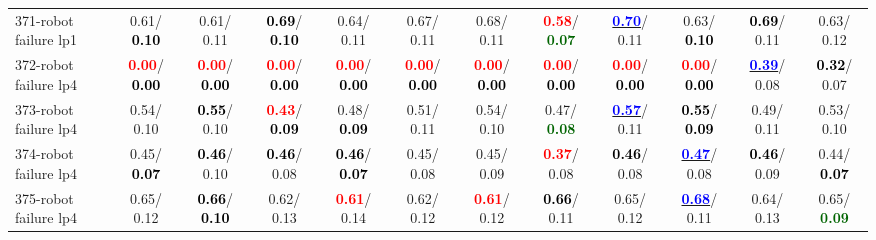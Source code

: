 \begin{table}[h]
\begin{center}
{\begin{tabular}{lc|c|c|c|c|c|c|c|c|c|c}
371-robot failure lp1 &   0.61/\textcolor{black}{\textbf{  0.10}} &   0.61/  0.11 & \textcolor{black}{\textbf{  0.69}}/\textcolor{black}{\textbf{  0.10}} &   0.64/  0.11 &   0.67/  0.11 &   0.68/  0.11 & \textcolor{red}{\textbf{  0.58}}/\textcolor{darkgreen}{\textbf{  0.07}} & \underline{\textcolor{blue}{\textbf{  0.70}}}/  0.11 &   0.63/\textcolor{black}{\textbf{  0.10}} & \textcolor{black}{\textbf{  0.69}}/  0.11 &   0.63/  0.12 \\
372-robot failure lp4 & \textcolor{red}{\textbf{  0.00}}/\textcolor{black}{\textbf{  0.00}} & \textcolor{red}{\textbf{  0.00}}/\textcolor{black}{\textbf{  0.00}} & \textcolor{red}{\textbf{  0.00}}/\textcolor{black}{\textbf{  0.00}} & \textcolor{red}{\textbf{  0.00}}/\textcolor{black}{\textbf{  0.00}} & \textcolor{red}{\textbf{  0.00}}/\textcolor{black}{\textbf{  0.00}} & \textcolor{red}{\textbf{  0.00}}/\textcolor{black}{\textbf{  0.00}} & \textcolor{red}{\textbf{  0.00}}/\textcolor{black}{\textbf{  0.00}} & \textcolor{red}{\textbf{  0.00}}/\textcolor{black}{\textbf{  0.00}} & \textcolor{red}{\textbf{  0.00}}/\textcolor{black}{\textbf{  0.00}} & \underline{\textcolor{blue}{\textbf{  0.39}}}/  0.08 & \textcolor{black}{\textbf{  0.32}}/  0.07 \\
373-robot failure lp4 &   0.54/  0.10 & \textcolor{black}{\textbf{  0.55}}/  0.10 & \textcolor{red}{\textbf{  0.43}}/\textcolor{black}{\textbf{  0.09}} &   0.48/\textcolor{black}{\textbf{  0.09}} &   0.51/  0.11 &   0.54/  0.10 &   0.47/\textcolor{darkgreen}{\textbf{  0.08}} & \underline{\textcolor{blue}{\textbf{  0.57}}}/  0.11 & \textcolor{black}{\textbf{  0.55}}/\textcolor{black}{\textbf{  0.09}} &   0.49/  0.11 &   0.53/  0.10 \\ \hline
374-robot failure lp4 &   0.45/\textcolor{black}{\textbf{  0.07}} & \textcolor{black}{\textbf{  0.46}}/  0.10 & \textcolor{black}{\textbf{  0.46}}/  0.08 & \textcolor{black}{\textbf{  0.46}}/\textcolor{black}{\textbf{  0.07}} &   0.45/  0.08 &   0.45/  0.09 & \textcolor{red}{\textbf{  0.37}}/  0.08 & \textcolor{black}{\textbf{  0.46}}/  0.08 & \underline{\textcolor{blue}{\textbf{  0.47}}}/  0.08 & \textcolor{black}{\textbf{  0.46}}/  0.09 &   0.44/\textcolor{black}{\textbf{  0.07}} \\
375-robot failure lp4 &   0.65/  0.12 & \textcolor{black}{\textbf{  0.66}}/\textcolor{black}{\textbf{  0.10}} &   0.62/  0.13 & \textcolor{red}{\textbf{  0.61}}/  0.14 &   0.62/  0.12 & \textcolor{red}{\textbf{  0.61}}/  0.12 & \textcolor{black}{\textbf{  0.66}}/  0.11 &   0.65/  0.12 & \underline{\textcolor{blue}{\textbf{  0.68}}}/  0.11 &   0.64/  0.13 &   0.65/\textcolor{darkgreen}{\textbf{  0.09}} \\

\end{tabular}}
\end{center}
\end{table}
